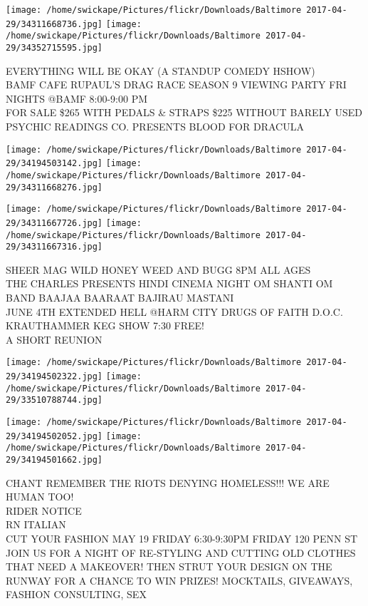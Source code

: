 \documentclass[10pt,letterpaper]{article}
\begin{document}
\texttt{[image: /home/swickape/Pictures/flickr/Downloads/Baltimore 2017-04-29/34311668736.jpg]}
\texttt{[image: /home/swickape/Pictures/flickr/Downloads/Baltimore 2017-04-29/34352715595.jpg]}

EVERYTHING WILL BE OKAY (A STANDUP COMEDY HSHOW)\\
BAMF CAFE RUPAUL'S DRAG RACE SEASON 9 VIEWING PARTY FRI NIGHTS @BAMF 8:00{-}9:00 PM\\
FOR SALE \$265 WITH PEDALS \& STRAPS \$225 WITHOUT BARELY USED\\
PSYCHIC READINGS CO. PRESENTS BLOOD FOR DRACULA
\pagebreak

\texttt{[image: /home/swickape/Pictures/flickr/Downloads/Baltimore 2017-04-29/34194503142.jpg]}
\texttt{[image: /home/swickape/Pictures/flickr/Downloads/Baltimore 2017-04-29/34311668276.jpg]}

\texttt{[image: /home/swickape/Pictures/flickr/Downloads/Baltimore 2017-04-29/34311667726.jpg]}
\texttt{[image: /home/swickape/Pictures/flickr/Downloads/Baltimore 2017-04-29/34311667316.jpg]}

SHEER MAG WILD HONEY WEED AND BUGG 8PM ALL AGES\\
THE CHARLES PRESENTS HINDI CINEMA NIGHT OM SHANTI OM BAND BAAJAA BAARAAT BAJIRAU MASTANI\\
JUNE 4TH EXTENDED HELL @HARM CITY DRUGS OF FAITH D.O.C. KRAUTHAMMER KEG SHOW 7:30 FREE!\\
A SHORT REUNION
\pagebreak

\texttt{[image: /home/swickape/Pictures/flickr/Downloads/Baltimore 2017-04-29/34194502322.jpg]}
\texttt{[image: /home/swickape/Pictures/flickr/Downloads/Baltimore 2017-04-29/33510788744.jpg]}

\texttt{[image: /home/swickape/Pictures/flickr/Downloads/Baltimore 2017-04-29/34194502052.jpg]}
\texttt{[image: /home/swickape/Pictures/flickr/Downloads/Baltimore 2017-04-29/34194501662.jpg]}

CHANT REMEMBER THE RIOTS DENYING HOMELESS!!! WE ARE HUMAN TOO!\\
RIDER NOTICE\\
RN ITALIAN\\
CUT YOUR FASHION MAY 19 FRIDAY 6:30{-}9:30PM FRIDAY 120 PENN ST JOIN US FOR A NIGHT OF RE{-}STYLING AND CUTTING OLD CLOTHES THAT NEED A MAKEOVER!  THEN STRUT YOUR DESIGN ON THE RUNWAY FOR A CHANCE TO WIN PRIZES!  MOCKTAILS, GIVEAWAYS, FASHION CONSULTING, SEX
\pagebreak
\end{document}
